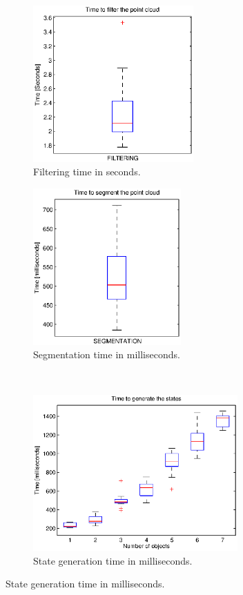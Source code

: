\begin{figure}[tb]
\centering
\begin{subfigure}[t]{0.4\textwidth}
\centering
\includegraphics[height=6.0cm]{Img/experiments/exp_good/data/filtering.eps}
\caption{Filtering time in seconds.}
\end{subfigure}
\begin{subfigure}[t]{0.4\textwidth}
\centering
\includegraphics[height=6.0cm]{Img/experiments/exp_good/data/segmentation.eps}
\caption{Segmentation time in milliseconds.}
\end{subfigure}
\\
\begin{subfigure}[t]{0.45\textwidth}
\centering
\includegraphics[height=6.0cm]
{Img/experiments/exp_good/data/predicates.eps}
\caption{State generation time in milliseconds.}

\end{subfigure}
\end{figure}
